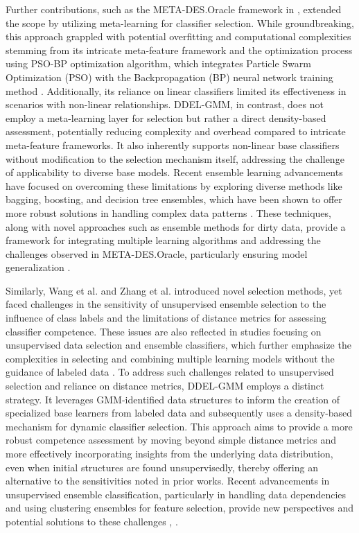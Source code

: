 \documentclass[lettersize,journal]{IEEEtran}
\newcommand{\greenhighlight}[1]{#1} %
\begin{document}
Further contributions, such as the META-DES.Oracle framework in \cite{cruz_meta-oracle_2017}, extended the scope by utilizing meta-learning for classifier selection. While groundbreaking, this approach grappled with potential overfitting and computational complexities stemming from its intricate meta-feature framework and the optimization process using PSO-BP optimization algorithm, which integrates Particle Swarm Optimization (PSO) with the Backpropagation (BP) neural network training method \cite{al-andoli_ensemble-based_2023}. Additionally, its reliance on linear classifiers limited its effectiveness in scenarios with non-linear relationships. \greenhighlight{DDEL-GMM, in contrast, does not employ a meta-learning layer for selection but rather a direct density-based assessment, potentially reducing complexity and overhead compared to intricate meta-feature frameworks. It also inherently supports non-linear base classifiers without modification to the selection mechanism itself, addressing the challenge of applicability to diverse base models.} Recent ensemble learning advancements have focused on overcoming these limitations by exploring diverse methods like bagging, boosting, and decision tree ensembles, which have been shown to offer more robust solutions in handling complex data patterns \cite{sagi_ensemble_2018}. These techniques, along with novel approaches such as ensemble methods for dirty data, provide a framework for integrating multiple learning algorithms and addressing the challenges observed in META-DES.Oracle, particularly ensuring model generalization \cite{liu_ensemble_2023}.

Similarly, Wang et al. \cite{wang_ensemble_2021} and Zhang et al. \cite{zhang_distance-based_2019} introduced novel selection methods, yet faced challenges in the sensitivity of unsupervised ensemble selection to the influence of class labels and the limitations of distance metrics for assessing classifier competence. These issues are also reflected in studies focusing on unsupervised data selection and ensemble classifiers, which further emphasize the complexities in selecting and combining multiple learning models without the guidance of labeled data \cite{elmi_novel_2023}. \greenhighlight{To address such challenges related to unsupervised selection and reliance on distance metrics, DDEL-GMM employs a distinct strategy. It leverages GMM-identified data structures to inform the creation of specialized base learners from labeled data and subsequently uses a density-based mechanism for dynamic classifier selection. This approach aims to provide a more robust competence assessment by moving beyond simple distance metrics and more effectively incorporating insights from the underlying data distribution, even when initial structures are found unsupervisedly, thereby offering an alternative to the sensitivities noted in prior works.} Recent advancements in unsupervised ensemble classification, particularly in handling data dependencies and using clustering ensembles for feature selection, provide new perspectives and potential solutions to these challenges \cite{tian_improved_2022}, \cite{traganitis_unsupervised_2022, ayerdi_spatially_2015}.
\end{document}
